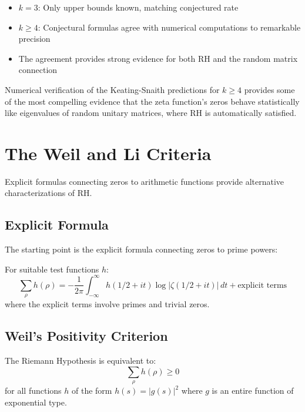 \begin{theorem}
\begin{itemize}
\item $k = 3$: Only upper bounds known, matching conjectured rate
\item $k \geq 4$: Conjectural formulas agree with numerical computations to remarkable precision
\item The agreement provides strong evidence for both RH and the random matrix connection
\end{itemize}
\end{theorem}

\begin{remark}
Numerical verification of the Keating-Snaith predictions for $k \geq 4$ provides some of the most compelling evidence that the zeta function's zeros behave statistically like eigenvalues of random unitary matrices, where RH is automatically satisfied.
\end{remark}

\section{The Weil and Li Criteria}

Explicit formulas connecting zeros to arithmetic functions provide alternative characterizations of RH.

\subsection{Explicit Formula}

The starting point is the explicit formula connecting zeros to prime powers:

\begin{theorem}
For suitable test functions $h$:
\begin{equation}
\sum_{\rho} h(\rho) = -\frac{1}{2\pi} \int_{-\infty}^{\infty} h(1/2 + it) \log|\zeta(1/2 + it)| \, dt + \text{explicit terms}
\end{equation}
where the explicit terms involve primes and trivial zeros.
\end{theorem}

\subsection{Weil's Positivity Criterion}

\begin{theorem}
The Riemann Hypothesis is equivalent to:
\begin{equation}
\sum_{\rho} h(\rho) \geq 0
\end{equation}
for all functions $h$ of the form $h(s) = |g(s)|^2$ where $g$ is an entire function of exponential type.
\end{theorem}

